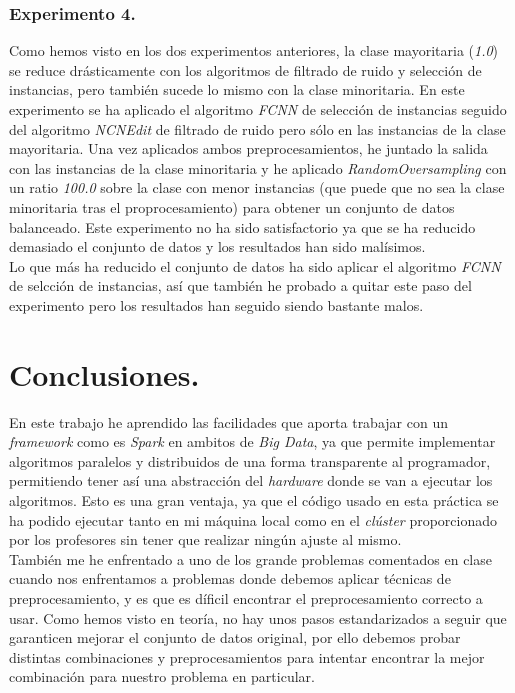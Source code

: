 \documentclass[11pt]{article}
\begin{document}
\subsubsection{Experimento 4.}

Como hemos visto en los dos experimentos anteriores, la clase mayoritaria (\textit{1.0}) se reduce drásticamente con los algoritmos de filtrado de ruido y selección de instancias, pero también sucede lo mismo con la clase minoritaria. En este experimento se ha aplicado el algoritmo \textit{FCNN} de selección de instancias seguido del algoritmo \textit{NCNEdit} de filtrado de ruido pero sólo en las instancias de la clase mayoritaria. Una vez aplicados ambos preprocesamientos, he juntado la salida con las instancias de la clase minoritaria y he aplicado \textit{RandomOversampling} con un ratio \textit{100.0} sobre la clase con menor instancias (que puede que no sea la clase minoritaria tras el proprocesamiento) para obtener un conjunto de datos balanceado. Este experimento no ha sido satisfactorio ya que se ha reducido demasiado el conjunto de datos y los resultados han sido malísimos. \\

Lo que más ha reducido el conjunto de datos ha sido aplicar el algoritmo \textit{FCNN} de selcción de instancias, así que también he probado a quitar este paso del experimento pero los resultados han seguido siendo bastante malos.

\section{Conclusiones.}

En este trabajo he aprendido las facilidades que aporta trabajar con un \textit{framework} como es \textit{Spark} en ambitos de \textit{Big Data}, ya que permite implementar algoritmos paralelos y distribuidos de una forma transparente al programador, permitiendo tener así una abstracción del \textit{hardware} donde se van a ejecutar los algoritmos. Esto es una gran ventaja, ya que el código usado en esta práctica se ha podido ejecutar tanto en mi máquina local como en el \textit{clúster} proporcionado por los profesores sin tener que realizar ningún ajuste al mismo. \\

También me he enfrentado a uno de los grande problemas comentados en clase cuando nos enfrentamos a problemas donde debemos aplicar técnicas de preprocesamiento, y es que es díficil encontrar el preprocesamiento correcto a usar. Como hemos visto en teoría, no hay unos pasos estandarizados a seguir que garanticen mejorar el conjunto de datos original, por ello debemos probar distintas combinaciones y preprocesamientos para intentar encontrar la mejor combinación para nuestro problema en particular.
\end{document}
